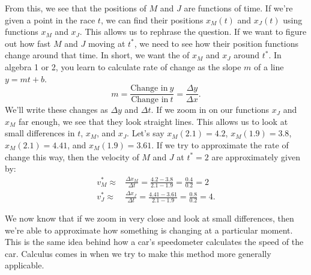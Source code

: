 \begin{exmp}
From this, we see that the positions of $M$ and $J$ are functions of time. If we're given a point in the race $t$, we can find their positions $x_M(t)$ and $x_J(t)$ using functions $x_M$ and $x_J$. This allows us to rephrase the question. If we want to figure out how fast $M$ and $J$ moving at $t^*$, we need to see how their position functions change around that time. In short, we want the  of $x_M$ and $x_J$ around $t^*$. In algebra 1 or 2, you learn to calculate rate of change as the slope $m$ of a line $y=mt+b$.
\begin{equation*}
	m = \frac{\text{Change in}\ y  }{\text{Change in}\ t} = \frac{\Delta y}{\Delta x}.
\end{equation*}
We'll write these changes as $\Delta y$ and $\Delta t$. If we zoom in on our functions $x_J$ and $x_M$ far enough, we see that they look straight lines. This allows us to look at small differences in $t$, $x_M$, and $x_J$. Let's say $x_M(2.1)=4.2$, $x_M(1.9)=3.8$, $x_M(2.1)=4.41$, and $x_M(1.9)= 3.61$. If we try to approximate the rate of change this way, then the velocity of $M$ and $J$ at $t^*=2$ are approximately given by: \begin{align}
	v^*_M\approx&\frac{\Delta x_M}{\Delta t}=\frac{4.2-3.8}{2.1-1.9}=\frac{0.4}{0.2}=2\\
	v^*_J\approx&\frac{\Delta x_J}{\Delta t}=\frac{4.41-3.61}{2.1-1.9}=\frac{0.8}{0.2}=4.
\end{align}

We now know that if we zoom in very close and look at small differences, then we're able to approximate how something is changing at a particular moment. This is the same idea behind how a car's speedometer calculates the speed of the car. Calculus comes in when we try to make this method more generally applicable.
\end{exmp}
